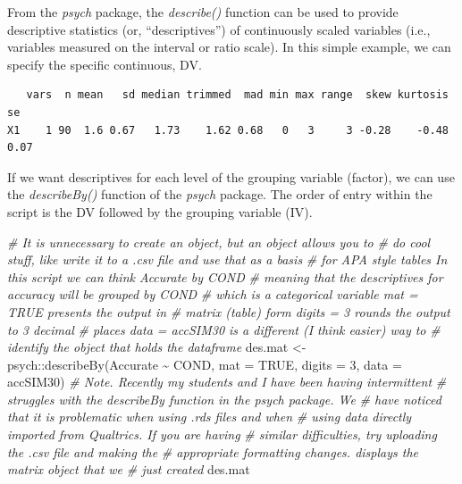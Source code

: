 \documentclass[
  11pt,
]{book}
\newenvironment{Shaded}{\begin{snugshade}}{\end{snugshade}}
\newcommand{\AttributeTok}[1]{\textcolor[rgb]{0.77,0.63,0.00}{#1}}
\newcommand{\CommentTok}[1]{\textcolor[rgb]{0.56,0.35,0.01}{\textit{#1}}}
\newcommand{\ConstantTok}[1]{\textcolor[rgb]{0.00,0.00,0.00}{#1}}
\newcommand{\DecValTok}[1]{\textcolor[rgb]{0.00,0.00,0.81}{#1}}
\newcommand{\FunctionTok}[1]{\textcolor[rgb]{0.00,0.00,0.00}{#1}}
\newcommand{\NormalTok}[1]{#1}
\newcommand{\OtherTok}[1]{\textcolor[rgb]{0.56,0.35,0.01}{#1}}
\newcommand{\SpecialCharTok}[1]{\textcolor[rgb]{0.00,0.00,0.00}{#1}}
\begin{document}
From the \emph{psych} package, the \emph{describe()} function can be used to provide descriptive statistics (or, ``descriptives'') of continuously scaled variables (i.e., variables measured on the interval or ratio scale). In this simple example, we can specify the specific continuous, DV.

\begin{Shaded}
\end{Shaded}

\begin{verbatim}
   vars  n mean   sd median trimmed  mad min max range  skew kurtosis   se
X1    1 90  1.6 0.67   1.73    1.62 0.68   0   3     3 -0.28    -0.48 0.07
\end{verbatim}

If we want descriptives for each level of the grouping variable (factor), we can use the \emph{describeBy()} function of the \emph{psych} package. The order of entry within the script is the DV followed by the grouping variable (IV).

\begin{Shaded}
\begin{Highlighting}[]
\CommentTok{\# It is unnecessary to create an object, but an object allows you to}
\CommentTok{\# do cool stuff, like write it to a .csv file and use that as a basis}
\CommentTok{\# for APA style tables In this script we can think \textquotesingle{}Accurate by COND\textquotesingle{}}
\CommentTok{\# meaning that the descriptives for accuracy will be grouped by COND}
\CommentTok{\# which is a categorical variable mat = TRUE presents the output in}
\CommentTok{\# matrix (table) form digits = 3 rounds the output to 3 decimal}
\CommentTok{\# places data = accSIM30 is a different (I think easier) way to}
\CommentTok{\# identify the object that holds the dataframe}
\NormalTok{des.mat }\OtherTok{\textless{}{-}}\NormalTok{ psych}\SpecialCharTok{::}\FunctionTok{describeBy}\NormalTok{(Accurate }\SpecialCharTok{\textasciitilde{}}\NormalTok{ COND, }\AttributeTok{mat =} \ConstantTok{TRUE}\NormalTok{, }\AttributeTok{digits =} \DecValTok{3}\NormalTok{, }\AttributeTok{data =}\NormalTok{ accSIM30)}
\CommentTok{\# Note. Recently my students and I have been having intermittent}
\CommentTok{\# struggles with the describeBy function in the psych package. We}
\CommentTok{\# have noticed that it is problematic when using .rds files and when}
\CommentTok{\# using data directly imported from Qualtrics. If you are having}
\CommentTok{\# similar difficulties, try uploading the .csv file and making the}
\CommentTok{\# appropriate formatting changes. displays the matrix object that we}
\CommentTok{\# just created}
\NormalTok{des.mat}
\end{Highlighting}
\end{Shaded}
\end{document}

